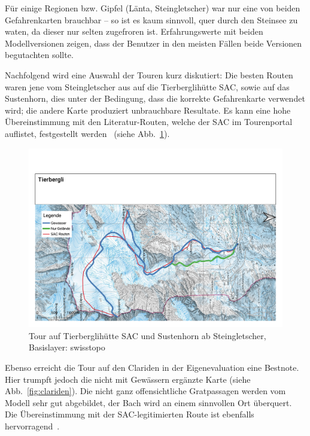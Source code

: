 Für einige Regionen bzw. Gipfel (Länta, Steingletscher) war nur eine von beiden Gefahrenkarten brauchbar -- so ist es kaum sinnvoll, quer durch den Steinsee zu waten, da dieser nur selten zugefroren ist. Erfahrungswerte mit beiden Modellversionen zeigen, dass der Benutzer in den meisten Fällen beide Versionen begutachten sollte.

Nachfolgend wird eine Auswahl der Touren kurz diskutiert: Die besten Routen waren jene vom Steingletscher aus auf die Tierberglihütte SAC, sowie auf das Sustenhorn, dies unter der Bedingung, dass die korrekte Gefahrenkarte verwendet wird; die andere Karte produziert unbrauchbare Resultate. Es kann eine hohe Übereinstimmung mit den Literatur-Routen, welche der SAC im Tourenportal auflistet, festgestellt werden~\cite{mmzentralch} (siehe Abb.\ \ref{fig:tierbergli}).
\begin{figure}[ht]
  \centering
  \includegraphics[page=1,width=.9\linewidth]{./../evaluation/PDFs/Tierbergli.pdf}
  \caption{Tour auf Tierberglihütte SAC und Sustenhorn ab Steingletscher, \\Basislayer: swisstopo}\label{fig:tierbergli}
\end{figure}


Ebenso erreicht die Tour auf den Clariden in der Eigenevaluation eine Bestnote. Hier trumpft jedoch die nicht mit Gewässern ergänzte Karte (siehe Abb.\ \ref{fig:clariden}). Die nicht ganz offensichtliche Gratpassagen werden vom Modell sehr gut abgebildet, der Bach wird an einem sinnvollen Ort überquert. Die Übereinstimmung mit der SAC-legitimierten Route ist ebenfalls hervorragend~\cite{twslstgallappzll}.

